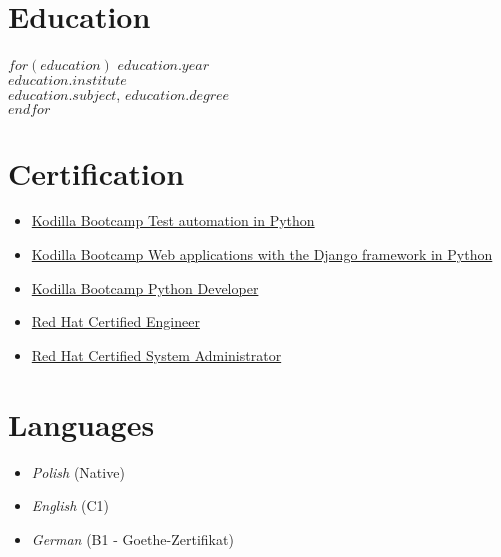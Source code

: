 \documentclass[$fontsize$, a4paper]{article}
\begin{document}
\begin{multicols}{2}

  \section*{Education}
  \setlength\itemsep{-0.5em}
  $for(education)$
  $education.year$\\
  \emph{$education.institute$}\\
  \textbf{$education.subject$}, $education.degree$\\
  
  $endfor$
  
  \columnbreak
  
  \section*{Certification}
  
  \begin{itemize}
    \setlength\itemsep{-0.5em}
    \item \href{https://github.com/TomaszKlosinski/kodilla-python-testing/blob/main/Certificate/EN_Tomasz%20K%C5%82osi%C5%84ski%20Certificate.pdf}{Kodilla Bootcamp Test automation in Python}
    \item \href{https://github.com/TomaszKlosinski/kodilla-django/blob/main/Certificates/EN_Tomasz%20K%C5%82osi%C5%84ski%20Certificate.pdf}{Kodilla Bootcamp Web applications with the Django framework in Python}
    \item \href{https://github.com/TomaszKlosinski/kodilla-python-bootcamp/blob/main/Certificate/EN_Tomasz%20K%C5%82osi%C5%84ski%20Certificate.pdf}{Kodilla Bootcamp Python Developer}
    \item \href{https://www.redhat.com/rhtapps/certification/verify/?certId=140-054-446}{Red Hat Certified Engineer}
    \item \href{https://www.redhat.com/rhtapps/certification/verify/?certId=140-054-446}{Red Hat Certified System Administrator}
  \end{itemize}
  
  \section*{Languages}
  \begin{itemize}
    \setlength\itemsep{-0.5em}
    \item \emph{Polish} (Native)
    \item \emph{English} (C1)
    \item \emph{German} (B1 - Goethe-Zertifikat)
  \end{itemize}
  
  \end{multicols}
  
\end{document}
